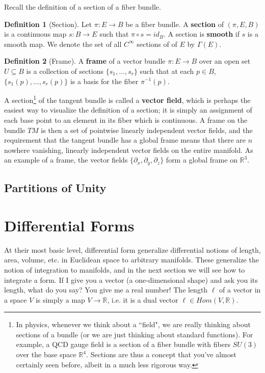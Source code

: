 \documentclass[11pt, oneside]{article}   	%
\theoremstyle{definition}
\newtheorem{definition}{Definition}[section]
\begin{document}
Recall the definition of a section of a fiber bundle.
\begin{definition}[Section]
	Let $\pi : E\rightarrow B$ be a fiber bundle. A \textbf{section} of $(\pi, E, B)$ is a continuous map $s : B\rightarrow E$ 
	such that $\pi\circ s = id_B$. A section is \textbf{smooth} if $s$ is a smooth map. We denote the set of all $C^\infty$ 
	sections of of $E$ by $\Gamma(E)$. 
\end{definition}
\begin{definition}[Frame]
	A \textbf{frame} of a vector bundle $\pi : E\rightarrow B$ over an open set $U\subseteq B$ is a collection of sections 
	$\{s_1, ..., s_r\}$ such that at each $p\in B$, $\{s_1(p), ..., s_r(p)\}$ is a basis for the fiber $\pi^{-1}(p)$. 
\end{definition}
A section\footnote{In physics, whenever we think about a ``field", we are really thinking about sections of a bundle (or we are 
just thinking about standard functions). For example, a QCD gauge field is a section of a fiber bundle with fibers $SU(3)$ over 
the base space $\mathbb R^4$. Sections are thus a concept that you've almost certainly seen before, albeit in a much less 
rigorous way.} of the tangent bundle is called a \textbf{vector field}, which is perhaps the easiest way to visualize the definition 
of a section; it is simply an assignment of each base point to an element in its fiber which is continuous. A frame on the bundle 
$TM$ is then a set of pointwise linearly independent vector fields, and the requirement that the tangent bundle has a global 
frame means that there are $n$ nowhere vanishing, linearly independent vector fields on the entire manifold. As an 
example of a frame, the vector fields $\{\partial_x, \partial_y, \partial_z\}$ form a global frame on $\mathbb R^3$. 

\subsection{Partitions of Unity}

\section{Differential Forms}

At their most basic level, differential form generalize differential notions of length, area, volume, etc. in Euclidean space to 
arbitrary manifolds. These generalize the notion of integration to manifolds, and in the next section we will see how to integrate 
a form. If I give you a vector (a one-dimensional shape) and ask you its length, what do you say? You give me a real number! 
The length $\ell$ of a vector in a space $V$ is simply a map $V\rightarrow\mathbb R$, i.e. it is a dual vector $\ell\in Hom(V, 
\mathbb R)$. 
\end{document}
